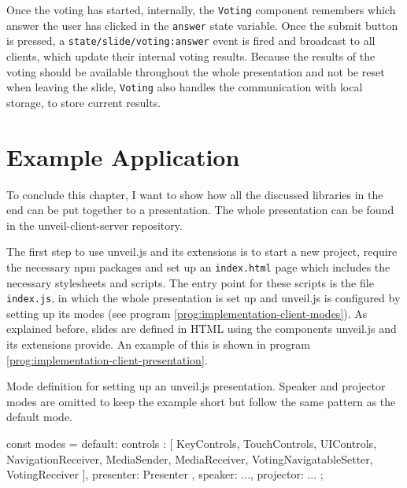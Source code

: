 Once the voting has started, internally, the \texttt{Voting} component remembers which answer the user has clicked in the \texttt{answer} state variable. Once the submit button is pressed, a \texttt{state/slide/voting:answer} event is fired and broadcast to all clients, which update their internal voting results.
Because the results of the voting should be available throughout the whole presentation and not be reset when leaving the slide, \texttt{Voting} also handles the communication with local storage, to store current results.

\section{Example Application}
\label{sec:implementation-client}

To conclude this chapter, I want to show how all the discussed libraries in the end can be put together to a presentation. The whole presentation can be found in the unveil-client-server repository.

The first step to use unveil.js and its extensions is to start a new project, require the necessary npm packages and set up an \texttt{index.html} page which includes the necessary stylesheets and scripts.
The entry point for these scripts is the file \texttt{index.js}, in which the whole presentation is set up and unveil.js is configured by setting up its modes (see program \ref{prog:implementation-client-modes}). As explained before, slides are defined in HTML using the components unveil.js and its extensions provide. An example of this is shown in program \ref{prog:implementation-client-presentation}.

\begin{program}
\caption{Mode definition for setting up an unveil.js presentation. Speaker and projector modes are omitted to keep the example short but follow the same pattern as the default mode.}
\label{prog:implementation-client-modes}
\begin{JsCode}
const modes = {
  default: {
    controls : [
      KeyControls, TouchControls, UIControls,
      NavigationReceiver,
      MediaSender, MediaReceiver,
      VotingNavigatableSetter, VotingReceiver
    ],
    presenter: Presenter
  },
  speaker: {...},
  projector: {...}
};
\end{JsCode}
\end{program}

